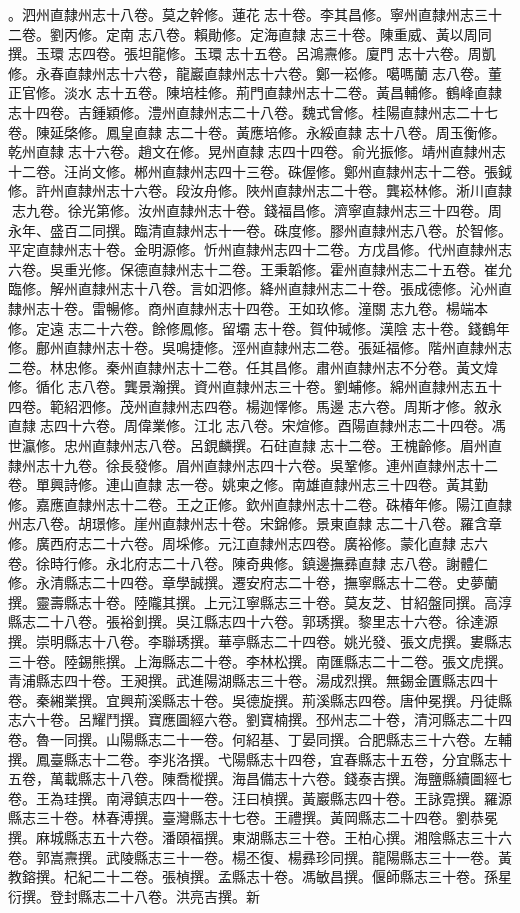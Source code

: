 \begin{pinyinscope}
。泗州直隸州志十八卷。莫之幹修。蓮花志十卷。李其昌修。寧州直隸州志三十二卷。劉丙修。定南志八卷。賴勛修。定海直隸志三十卷。陳重威、黃以周同撰。玉環志四卷。張坦龍修。玉環志十五卷。呂鴻燾修。廈門志十六卷。周凱修。永春直隸州志十六卷，龍巖直隸州志十六卷。鄭一崧修。噶嗎蘭志八卷。董正官修。淡水志十五卷。陳培桂修。荊門直隸州志十二卷。黃昌輔修。鶴峰直隸志十四卷。吉鍾穎修。澧州直隸州志二十八卷。魏式曾修。桂陽直隸州志二十七卷。陳延棨修。鳳皇直隸志二十卷。黃應培修。永綏直隸志十八卷。周玉衡修。乾州直隸志十六卷。趙文在修。晃州直隸志四十四卷。俞光振修。靖州直隸州志十二卷。汪尚文修。郴州直隸州志四十三卷。硃偓修。鄭州直隸州志十二卷。張鉞修。許州直隸州志十六卷。段汝舟修。陜州直隸州志二十卷。龔崧林修。淅川直隸志九卷。徐光第修。汝州直隸州志十卷。錢福昌修。濟寧直隸州志三十四卷。周永年、盛百二同撰。臨清直隸州志十一卷。硃度修。膠州直隸州志八卷。於智修。平定直隸州志十卷。金明源修。忻州直隸州志四十二卷。方戊昌修。代州直隸州志六卷。吳重光修。保德直隸州志十二卷。王秉韜修。霍州直隸州志二十五卷。崔允臨修。解州直隸州志十八卷。言如泗修。絳州直隸州志二十卷。張成德修。沁州直隸州志十卷。雷暢修。商州直隸州志十四卷。王如玖修。潼關志九卷。楊端本修。定遠志二十六卷。餘修鳳修。留壩志十卷。賀仲瑊修。漢陰志十卷。錢鶴年修。鄜州直隸州志十卷。吳鳴捷修。涇州直隸州志二卷。張延福修。階州直隸州志二卷。林忠修。秦州直隸州志十二卷。任其昌修。肅州直隸州志不分卷。黃文煒修。循化志八卷。龔景瀚撰。資州直隸州志三十卷。劉蜅修。綿州直隸州志五十四卷。範紹泗修。茂州直隸州志四卷。楊迦懌修。馬邊志六卷。周斯才修。敘永直隸志四十六卷。周偉業修。江北志八卷。宋煊修。酉陽直隸州志二十四卷。馮世瀛修。忠州直隸州志八卷。呂鋧麟撰。石砫直隸志十二卷。王槐齡修。眉州直隸州志十九卷。徐長發修。眉州直隸州志四十六卷。吳鞏修。連州直隸州志十二卷。單興詩修。連山直隸志一卷。姚柬之修。南雄直隸州志三十四卷。黃其勤修。嘉應直隸州志十二卷。王之正修。欽州直隸州志十二卷。硃椿年修。陽江直隸州志八卷。胡璟修。崖州直隸州志十卷。宋錦修。景東直隸志二十八卷。羅含章修。廣西府志二十六卷。周埰修。元江直隸州志四卷。廣裕修。蒙化直隸志六卷。徐時行修。永北府志二十八卷。陳奇典修。鎮邊撫彞直隸志八卷。謝體仁修。永清縣志二十四卷。章學誠撰。遷安府志二十卷，撫寧縣志十二卷。史夢蘭撰。靈壽縣志十卷。陸隴其撰。上元江寧縣志三十卷。莫友芝、甘紹盤同撰。高淳縣志二十八卷。張裕釗撰。吳江縣志四十六卷。郭琇撰。黎里志十六卷。徐達源撰。崇明縣志十八卷。李聯琇撰。華亭縣志二十四卷。姚光發、張文虎撰。婁縣志三十卷。陸錫熊撰。上海縣志二十卷。李林松撰。南匯縣志二十二卷。張文虎撰。青浦縣志四十卷。王昶撰。武進陽湖縣志三十卷。湯成烈撰。無錫金匱縣志四十卷。秦緗業撰。宜興荊溪縣志十卷。吳德旋撰。荊溪縣志四卷。唐仲冕撰。丹徒縣志六十卷。呂耀鬥撰。寶應圖經六卷。劉寶楠撰。邳州志二十卷，清河縣志二十四卷。魯一同撰。山陽縣志二十一卷。何紹基、丁晏同撰。合肥縣志三十六卷。左輔撰。鳳臺縣志十二卷。李兆洛撰。弋陽縣志十四卷，宜春縣志十五卷，分宜縣志十五卷，萬載縣志十八卷。陳喬樅撰。海昌備志十六卷。錢泰吉撰。海鹽縣續圖經七卷。王為珪撰。南潯鎮志四十一卷。汪曰楨撰。黃巖縣志四十卷。王詠霓撰。羅源縣志三十卷。林春溥撰。臺灣縣志十七卷。王禮撰。黃岡縣志二十四卷。劉恭冕撰。麻城縣志五十六卷。潘頤福撰。東湖縣志三十卷。王柏心撰。湘陰縣志三十六卷。郭嵩燾撰。武陵縣志三十一卷。楊丕復、楊彞珍同撰。龍陽縣志三十一卷。黃教鎔撰。杞紀二十二卷。張楨撰。孟縣志十卷。馮敏昌撰。偃師縣志三十卷。孫星衍撰。登封縣志二十八卷。洪亮吉撰。新
\end{pinyinscope}
